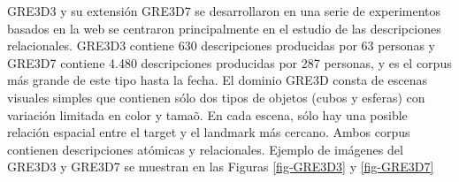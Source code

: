 \label{sec:corpusGRE}
GRE3D3 y su extensi\'on GRE3D7 \cite{gre3d3,gre3d7} se desarrollaron en una serie de experimentos basados en la web se centraron principalmente en el estudio de las descripciones relacionales. GRE3D3 contiene 630 descripciones producidas por 63 personas y GRE3D7 contiene 4.480 descripciones producidas por 287 personas, y es el corpus m\'as grande de este tipo hasta la fecha. El dominio GRE3D consta de escenas visuales simples que contienen s\'olo dos tipos de objetos (cubos y esferas) con variaci\'on limitada en color y tama\~o. En cada escena, s\'olo hay una posible relaci\'on espacial entre el target y el landmark m\'as cercano. Ambos corpus contienen descripciones at\'omicas y relacionales. Ejemplo de im\'agenes del GRE3D3 y GRE3D7 se muestran en las Figuras \ref{fig-GRE3D3} y \ref{fig-GRE3D7}

